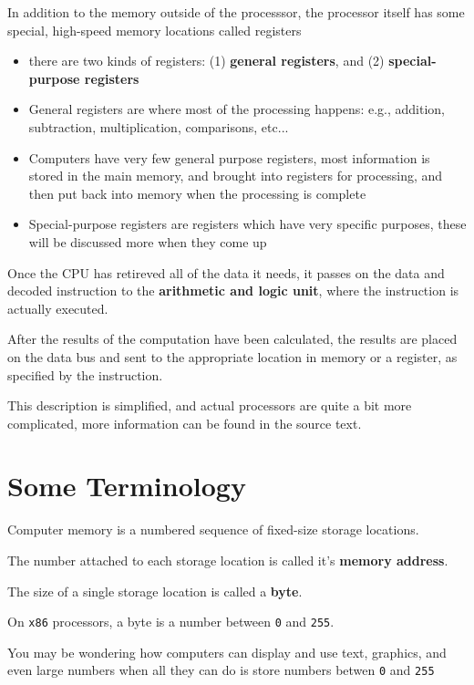 \documentclass{article}
\newcommand {\code}{\texttt}
\begin{document}
	In addition to the memory outside of the processsor, the processor itself has
	some special, high-speed memory locations called registers
	\begin {itemize}
		\item there are two kinds of registers: (1) \textbf {general registers}, and
			(2) \textbf {special-purpose registers}
		\item General registers are where most of the processing happens: e.g., addition,
			subtraction, multiplication, comparisons, etc...
		\item Computers have very few general purpose registers, most information
			is stored in the main memory, and brought into registers for processing, and
			then put back into memory when the processing is complete
		\item Special-purpose registers are registers which have very specific 
			purposes, these will be discussed more when they come up
	\end {itemize}
	
	Once the CPU has retireved all of the data it needs, it passes on the data
	and decoded instruction to the \textbf {arithmetic and logic unit}, where the
	instruction is actually executed.
	
	After the results of the computation have been calculated, the results are placed
	on the data bus and sent to the appropriate location in memory or a register, as 
	specified by the instruction.
	
	This description is simplified, and actual processors are quite a bit more complicated,
	more information can be found in the source text.
	
	\section {Some Terminology}
	\label {sec:terms}
	
	Computer memory is a numbered sequence of fixed-size storage locations.
	
	The number attached to each storage location is called it's
	\textbf {memory address}.
	
	The size of a single storage location is called a \textbf {byte}.
	
	On \code {x86} processors, a byte is a number between \code {0} and \code {255}.
	
	You may be wondering how computers can display and use text, graphics, and even
	large numbers when all they can do is store numbers betwen \code 0 and \code {255}
	
\end{document}
